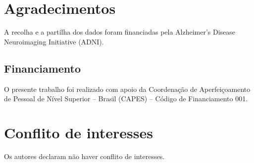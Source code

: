 \documentclass[review]{elsarticle}
\begin{document}
\section*{Agradecimentos}

A recolha e a partilha dos dados foram financiadas pela Alzheimer's Disease Neuroimaging Initiative (ADNI).

\subsection*{Financiamento}

O presente trabalho foi realizado com apoio da Coordenação de Aperfeiçoamento de Pessoal de Nível Superior -- Brasil (CAPES) -- Código de Financiamento 001.

\section*{Conflito de interesses}

Os autores declaram não haver conflito de interesses.



\end{document}
